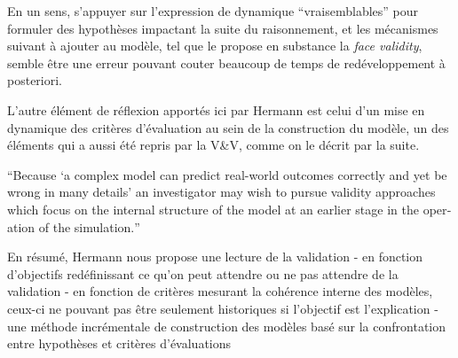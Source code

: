 En un sens, s'appuyer sur l'expression de dynamique \enquote{vraisemblables} pour formuler des hypothèses impactant la suite du raisonnement, et les mécanismes suivant à ajouter au modèle, tel que le propose en substance la \textit{face validity}, semble être une erreur pouvant couter beaucoup de temps de redéveloppement à posteriori.








L'autre élément de réflexion apportés ici par Hermann est celui d'un mise en dynamique des critères d'évaluation au sein de la construction du modèle, un des éléments qui a aussi été repris par la V\&V, comme on le décrit par la suite.

\foreignquote{english}{Because \enquote{a complex model can predict real-world outcomes correctly and yet be wrong in many details} \autocite[64]{Pool1965} an investigator may wish to pursue validity approaches which focus on the internal structure of the model at an earlier stage in the operation of the simulation.} \autocite[226]{Hermann1967} 

En résumé, Hermann nous propose une lecture de la validation
- en fonction d'objectifs redéfinissant ce qu'on peut attendre ou ne pas attendre de la validation
- en fonction de critères mesurant la cohérence interne des modèles, ceux-ci ne pouvant pas être seulement historiques si l'objectif est l'explication
- une méthode incrémentale de construction des modèles basé sur la confrontation entre hypothèses et critères d'évaluations


